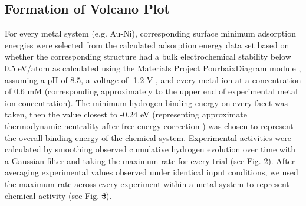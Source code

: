 \documentclass[preprint,12pt]{elsarticle}
\providecommand{\DIFadd}[1]{{\protect\color{blue}\uwave{#1}}} %
\providecommand{\DIFdel}[1]{{\protect\color{red}\sout{#1}}}                      %
\providecommand{\DIFaddbegin}{} %
\providecommand{\DIFaddend}{} %
\providecommand{\DIFdelbegin}{} %
\providecommand{\DIFdelend}{} %
\newcommand{\DIFscaledelfig}{0.5}
\newlength{\DIFdelgraphicswidth} %
\newlength{\DIFdelgraphicsheight} %
\newcommand{\DIFaddincludegraphics}[2][]{{\color{blue}\fbox{\DIFOincludegraphics[#1]{#2}}}} %
\newcommand{\DIFdelincludegraphics}[2][]{%
\sbox{\DIFdelgraphicsbox}{\DIFOincludegraphics[#1]{#2}}%
\settoboxwidth{\DIFdelgraphicswidth}{\DIFdelgraphicsbox} %
\settoboxtotalheight{\DIFdelgraphicsheight}{\DIFdelgraphicsbox} %
\scalebox{\DIFscaledelfig}{%
\parbox[b]{\DIFdelgraphicswidth}{\usebox{\DIFdelgraphicsbox}\\[-\baselineskip] \rule{\DIFdelgraphicswidth}{0em}}\llap{\resizebox{\DIFdelgraphicswidth}{\DIFdelgraphicsheight}{%
\setlength{\unitlength}{\DIFdelgraphicswidth}%
\begin{picture}(1,1)%
\thicklines\linethickness{2pt} %
{\color[rgb]{1,0,0}\put(0,0){\framebox(1,1){}}}%
{\color[rgb]{1,0,0}\put(0,0){\line( 1,1){1}}}%
{\color[rgb]{1,0,0}\put(0,1){\line(1,-1){1}}}%
\end{picture}%
}\hspace*{3pt}}} %
} %
\DeclareRobustCommand{\DIFaddbegin}{\DIFOaddbegin \let\includegraphics\DIFaddincludegraphics} %
\DeclareRobustCommand{\DIFaddend}{\DIFOaddend \let\includegraphics\DIFOincludegraphics} %
\DeclareRobustCommand{\DIFdelbegin}{\DIFOdelbegin \let\includegraphics\DIFdelincludegraphics} %
\DeclareRobustCommand{\DIFdelend}{\DIFOaddend \let\includegraphics\DIFOincludegraphics} %
\begin{document}
\subsection{Formation of Volcano Plot}\label{Section:Experimental/Volcano}
For every metal system (e.g. Au-Ni), corresponding surface minimum adsorption energies were selected from the calculated adsorption energy data set based on whether the corresponding structure had a bulk electrochemical stability below 0.5 eV/atom as calculated using the Materials Project PourbaixDiagram module \cite{singh2017electrochemical,persson2012prediction,patel2019efficient}, assuming a pH of 8.5, a voltage of -1.2 V \cite{lowry2005single}, and every metal ion at a concentration of 0.6 mM (corresponding approximately to the upper end of experimental metal ion concentration). The minimum hydrogen binding energy on every facet was taken, then the value closest to -0.24 eV (representing approximate thermodynamic neutrality after free energy correction \cite{norskov2005trends}) was chosen to represent the overall binding energy of the chemical system. Experimental activities were calculated by smoothing observed cumulative hydrogen evolution over time with a Gaussian filter and taking the maximum rate for every trial (see Fig. \DIFdelbegin \DIFdel{2}\DIFdelend \DIFaddbegin \DIFadd{\ref{figure_2}}\DIFaddend ). After averaging experimental values observed under identical input conditions, we used the maximum rate across every experiment within a metal system to represent chemical activity (see Fig. \DIFdelbegin \DIFdel{3}\DIFdelend \DIFaddbegin \DIFadd{\ref{figure_3}}\DIFaddend ). 
\end{document}
